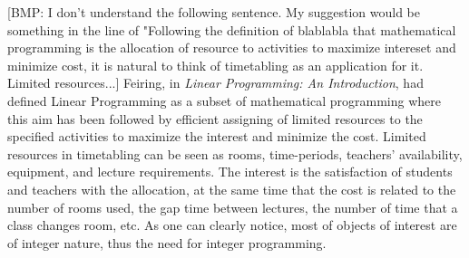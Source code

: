\documentclass[a4paper]{report}
\begin{document}
[BMP: I don't understand the following sentence. My suggestion would be something in the line of "Following the definition of blablabla that mathematical programming is the allocation of resource to activities to maximize intereset and minimize cost, it is natural to think of timetabling as an application for it. Limited resources...]
Feiring, in \emph{Linear Programming: An Introduction}, had defined Linear Programming as a subset of mathematical programming where this aim has been followed by efficient assigning of limited resources to the specified activities to maximize the interest and minimize the cost. Limited resources in timetabling can be seen as rooms, time-periods, teachers' availability, equipment, and lecture requirements. The interest is the satisfaction of students and teachers with the allocation, at the same time that the cost is related to the number of rooms used, the gap time between lectures, the number of time that a class changes room, etc. As one can clearly notice, most of objects of interest are of integer nature, thus the need for integer programming.
\end{document}
